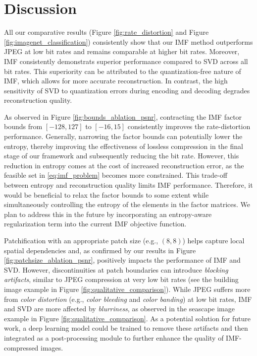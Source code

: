\section{Discussion} \label{sec:discussion}

All our comparative results (Figure \ref{fig:rate_distortion} and Figure \ref{fig:imagenet_classification}) consistently show that our IMF method outperforms JPEG at low bit rates and remains comparable at higher bit rates. Moreover, IMF consistently demonstrats superior performance compared to SVD across all bit rates. This superiority can be attributed to the quantization-free nature of IMF, which allows for more accurate reconstruction. In contrast, the high sensitivity of SVD to quantization errors during encoding and decoding degrades reconstruction quality.


As observed in Figure \ref{fig:bounds_ablation_psnr}, contracting the IMF factor bounds from $[-128, 127]$ to $[-16, 15]$ consistently improves the rate-distortion performance. Generally, narrowing the factor bounds can potentially lower the entropy, thereby improving the effectiveness of lossless compression in the final stage of our framework and subsequently reducing the bit rate. However, this reduction in entropy comes at the cost of increased reconstruction error, as the feasible set in \eqref{eq:imf_problem} becomes more constrained. This trade-off between entropy and reconstruction quality limits IMF performance. Therefore, it would be beneficial to relax the factor bounds to some extent while simultaneously controlling the entropy of the elements in the factor matrices. We plan to address this in the future by incorporating an entropy-aware regularization term into the current IMF objective function.

Patchification with an appropriate patch size (e.g., $(8, 8)$) helps capture local spatial dependencies and, as confirmed by our results in Figure \ref{fig:patchsize_ablation_psnr}, positively impacts the performance of IMF and SVD. However, discontinuities at patch boundaries can introduce \emph{blocking artifacts}, similar to JPEG compression at very low bit rates (see the building image example in Figure \ref{fig:qualitative_comparison}). While JPEG suffers more from \emph{color distortion} (e.g., \emph{color bleeding} and \emph{color banding}) at low bit rates, IMF and SVD are more affected by \emph{blurriness}, as observed in the seascape image example in Figure \ref{fig:qualitative_comparison}. As a potential solution for future work, a deep learning model could be trained to remove these artifacts and then integrated as a post-processing module to further enhance the quality of IMF-compressed images.

